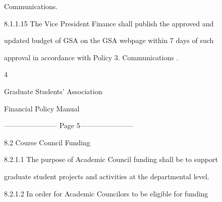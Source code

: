      Communications.  



8.1.1.15  The  Vice  President  Finance  shall  publish  the  approved  and  

     updated budget of GSA on the GSA webpage within 7 days of such  

     approval in accordance with Policy 3. Communications .   



       



  



  



  



  



  



  



  



  



  



                                                      4  

                                  

                                  

                                Graduate Students’ Association  

                                    Financial Policy Manual  

  


----------------------- Page 5-----------------------

                       8.2      Course Council Funding   



  



8.2.1.1       The purpose of Academic Council  funding shall be to support  

     graduate student projects and activities at the departmental level.   



  



8.2.1.2       In  order  for  Academic  Councilors  to  be  eligible  for  funding  

